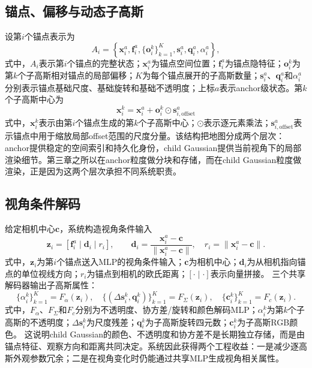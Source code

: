 \subsection{锚点、偏移与动态子高斯}

设第$i$个锚点表示为
\begin{equation}
A_i=\left\{
\mathbf{x}_i^a,\mathbf{f}_i^a,
\{\mathbf{o}_i^k\}_{k=1}^{K},
\mathbf{s}_i^a,\mathbf{q}_i^a,\alpha_i^a
\right\},
\end{equation}
式中，$A_i$表示第$i$个锚点的完整状态；$\mathbf{x}_i^a$为锚点空间位置；$\mathbf{f}_i^a$为锚点隐特征；$\mathbf{o}_i^k$为第$k$个子高斯相对锚点的局部偏移；$K$为每个锚点展开的子高斯数量；$\mathbf{s}_i^a$、$\mathbf{q}_i^a$和$\alpha_i^a$分别表示锚点基础尺度、基础旋转和基础不透明度；上标$a$表示anchor级状态。第$k$个子高斯中心为
\begin{equation}
\mathbf{x}_i^k=
\mathbf{x}_i^a+
\mathbf{o}_i^k\odot\mathbf{s}_{i,\mathrm{offset}}^a
\end{equation}
式中，$\mathbf{x}_i^k$表示由第$i$个锚点生成的第$k$个子高斯中心；$\odot$表示逐元素乘法；$\mathbf{s}_{i,\mathrm{offset}}^a$表示锚点中用于缩放局部offset范围的尺度分量。该结构把地图分成两个层次：anchor提供稳定的空间索引和持久化身份，child Gaussian提供当前视角下的局部渲染细节。第三章之所以在anchor粒度做分块和存储，而在child Gaussian粒度做渲染，正是因为这两个层次承担不同系统职责。

\subsection{视角条件解码}

给定相机中心$\mathbf{c}$，系统构造视角条件输入
\begin{equation}
\mathbf{z}_i=
\left[
\mathbf{f}_i^a
\mid
\mathbf{d}_i
\mid
r_i
\right],
\qquad
\mathbf{d}_i=
\frac{\mathbf{x}_i^a-\mathbf{c}}{\|\mathbf{x}_i^a-\mathbf{c}\|},
\quad
r_i=\|\mathbf{x}_i^a-\mathbf{c}\|.
\end{equation}
式中，$\mathbf{z}_i$为第$i$个锚点送入MLP的视角条件输入；$\mathbf{c}$为相机中心；$\mathbf{d}_i$为从相机指向锚点的单位视线方向；$r_i$为锚点到相机的欧氏距离；$[\cdot\mid\cdot]$表示向量拼接。
三个共享解码器输出子高斯属性：
\begin{equation}
\{\alpha_i^k\}_{k=1}^{K}=F_{\alpha}(\mathbf{z}_i),
\quad
\{(\Delta\mathbf{s}_i^k,\mathbf{q}_i^k)\}_{k=1}^{K}=F_{\Sigma}(\mathbf{z}_i),
\quad
\{\mathbf{c}_i^k\}_{k=1}^{K}=F_c(\mathbf{z}_i).
\end{equation}
式中，$F_{\alpha}$、$F_{\Sigma}$和$F_c$分别为不透明度、协方差/旋转和颜色解码MLP；$\alpha_i^k$为第$k$个子高斯的不透明度；$\Delta\mathbf{s}_i^k$为尺度残差；$\mathbf{q}_i^k$为子高斯旋转四元数；$\mathbf{c}_i^k$为子高斯RGB颜色。
这说明child Gaussian的颜色、不透明度和协方差不是长期独立存储，而是由锚点特征、观察方向和距离共同决定。系统因此获得两个工程收益：一是减少逐高斯外观参数冗余；二是在视角变化时仍能通过共享MLP生成视角相关属性。

